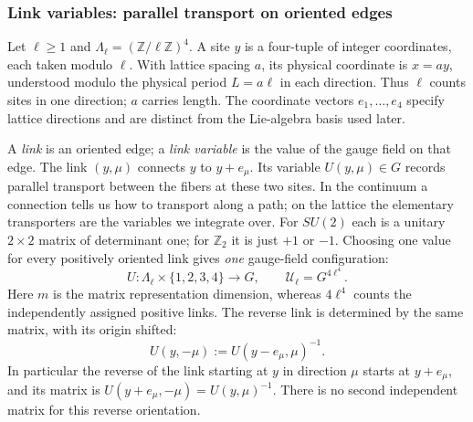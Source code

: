 \subsubsection{Link variables: parallel transport on oriented edges}\label{ym:sec:link-variables}
Let $\ell\ge1$ and $\Lambda_\ell=(\mathbb Z/\ell\mathbb Z)^4$. A site $y$ is
a four-tuple of integer coordinates, each taken modulo $\ell$. With lattice
spacing $a$, its physical coordinate is $x=ay$, understood modulo the
physical period $L=a\ell$ in each direction. Thus $\ell$ counts sites in one direction;
$a$ carries length. The coordinate vectors $e_1,\dots,e_4$ specify lattice
directions and are distinct from the Lie-algebra basis used later.

A \emph{link} is an oriented edge; a \emph{link variable} is the value of
the gauge field on that edge. The link $(y,\mu)$ connects $y$ to $y+e_\mu$.
Its variable $U(y,\mu)\in G$ records parallel transport between the
fibers at these two sites. In the continuum a connection tells us how to
transport along a path; on the lattice the elementary transporters are the
variables we integrate over. For $SU(2)$ each is a unitary $2\times2$
matrix of determinant one; for $\mathbb Z_2$ it is just $+1$ or $-1$.
Choosing one value for every positively oriented link gives \emph{one}
gauge-field configuration:
\begin{equation}\label{ym:configuration-space}
 U\colon\Lambda_\ell\times\{1,2,3,4\}\longrightarrow G,
 \qquad \mathcal U_\ell=G^{4\ell^4}.
\end{equation}
Here $m$ is the matrix representation dimension, whereas $4\ell^4$ counts
the independently assigned positive links. The reverse link is determined
by the same matrix, with its origin shifted:
\begin{equation}\label{ym:reverse-link}
 U(y,-\mu):=U(y-e_\mu,\mu)^{-1}.
\end{equation}
In particular the reverse of the link starting at $y$ in direction $\mu$
starts at $y+e_\mu$, and its matrix is
$U(y+e_\mu,-\mu)=U(y,\mu)^{-1}$. There is no second independent matrix for
this reverse orientation.

